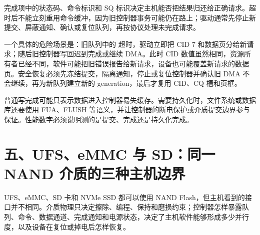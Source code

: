 完成项中的状态码、命令标识和 SQ 标识决定主机能否把结果归还给正确请求。超时后不能立刻重用命令缓冲，因为旧控制器事务可能仍在路上；驱动通常先停止新提交、屏蔽通知、确认或复位队列，再按协议处理未完成请求。

一个具体的危险场景是：旧队列中的  超时，驱动立即把 CID 7 和数据页分给新请求；随后旧控制器写回迟到完成或继续 DMA。此时 CID 数值虽然相同，资源所有者已经不同，软件可能把旧错误报告给新请求，设备也可能覆盖新请求的数据页。安全恢复必须先冻结提交，隔离通知，停止或复位控制器并确认旧 DMA 不会继续，再为新队列建立新的 generation，最后才复用 CID、CQ 槽和页框。

普通写完成可能只表示数据进入控制器易失缓存。需要持久化时，文件系统或数据库还要使用 FUA、FLUSH 等语义，并让控制器的断电保护或介质提交边界参与保证。性能数字必须说明测的是提交、完成还是持久化完成。




























\section{五、UFS、eMMC 与 SD：同一 NAND 介质的三种主机边界}

UFS、eMMC、SD 卡和 NVMe SSD 都可以使用 NAND Flash，但主机看到的接口并不相同。介质物理只决定擦除、编程、保持和磨损约束；控制器怎样暴露队列、命令、数据通道、完成通知和电源状态，决定了主机软件能够形成多少并行度，以及设备在复位或掉电后怎样恢复。

